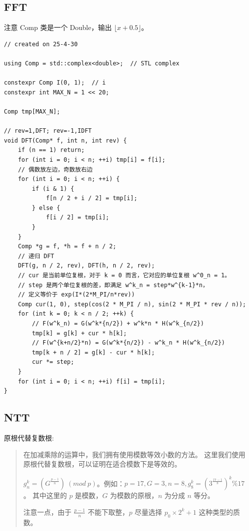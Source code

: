 \documentclass[a4paper,12pt]{article}
\begin{document}
\subsection{FFT}

\noindent 注意 Comp 类是一个 Double，输出 $\lfloor x + 0.5 \rfloor$。

\begin{lstlisting}
// created on 25-4-30

using Comp = std::complex<double>;  // STL complex

constexpr Comp I(0, 1);  // i
constexpr int MAX_N = 1 << 20;

Comp tmp[MAX_N];

// rev=1,DFT; rev=-1,IDFT
void DFT(Comp* f, int n, int rev) {
    if (n == 1) return;
    for (int i = 0; i < n; ++i) tmp[i] = f[i];
    // 偶数放左边，奇数放右边
    for (int i = 0; i < n; ++i) {
        if (i & 1) {
            f[n / 2 + i / 2] = tmp[i];
        } else {
            f[i / 2] = tmp[i];
        }
    }
    Comp *g = f, *h = f + n / 2;
    // 递归 DFT
    DFT(g, n / 2, rev), DFT(h, n / 2, rev);
    // cur 是当前单位复根，对于 k = 0 而言，它对应的单位复根 w^0_n = 1。
    // step 是两个单位复根的差，即满足 w^k_n = step*w^{k-1}*n，
    // 定义等价于 exp(I*(2*M_PI/n*rev))
    Comp cur(1, 0), step(cos(2 * M_PI / n), sin(2 * M_PI * rev / n));
    for (int k = 0; k < n / 2; ++k) {  
        // F(w^k_n) = G(w^k*{n/2}) + w^k*n * H(w^k_{n/2})
        tmp[k] = g[k] + cur * h[k];
        // F(w^{k+n/2}*n) = G(w^k*{n/2}) - w^k_n * H(w^k_{n/2})
        tmp[k + n / 2] = g[k] - cur * h[k];
        cur *= step;
    }
    for (int i = 0; i < n; ++i) f[i] = tmp[i];
}
\end{lstlisting}

\subsection{NTT}

\noindent 原根代替复数根: \\

\begin{quote}
    在加减乘除的运算中，我们拥有使用模数等效小数的方法。
    这里我们使用原根代替复数根，可以证明在适合模数下是等效的。

    \(g_n^k = (G^{\frac{p-1}{n}})\ (mod \ p)\)。例如：\(p = 17, G = 3, n = 8,g_8^k = (3^{\frac{17-1}{8}})^k \% 17\)。
    其中这里的 \(p\) 是模数，\(G\) 为模数的原根，\(n\) 为分成 \(n\) 等分。

    注意一点，由于 \(\frac{p-1}{n}\) 不能下取整，\(p\) 尽量选择
    \(p_0 \times 2^k + 1\) 这种类型的质数。
\end{quote}
    
\end{document}
